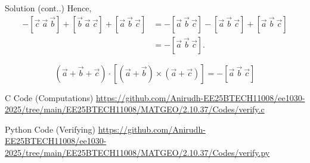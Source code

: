 \documentclass{beamer}
\begin{document}
\begin{frame}{Solution (cont..)}
Hence,
\begin{align}
- [\vec{c}\ \vec{a}\ \vec{b}] + [\vec{b}\ \vec{a}\ \vec{c}] + [\vec{a}\ \vec{b}\ \vec{c}]
&= -[\vec{a}\ \vec{b}\ \vec{c}] - [\vec{a}\ \vec{b}\ \vec{c}] + [\vec{a}\ \vec{b}\ \vec{c}] \\[4pt]
&= -[\vec{a}\ \vec{b}\ \vec{c}].
\end{align}

\[
\boxed{(\vec{a} + \vec{b} + \vec{c}) \cdot [(\vec{a} + \vec{b}) \times (\vec{a} + \vec{c})] = -[\vec{a}\ \vec{b}\ \vec{c}]}
\]
\end{frame}

\begin{frame}[fragile]{C Code (Computations)}
\url{https://github.com/Anirudh-EE25BTECH11008/ee1030-2025/tree/main/EE25BTECH11008/MATGEO/2.10.37/Codes/verify.c}
\end{frame}

\begin{frame}[fragile]{Python Code (Verifying)}
\url{https://github.com/Anirudh-EE25BTECH11008/ee1030-2025/tree/main/EE25BTECH11008/MATGEO/2.10.37/Codes/verify.py}
\end{frame}
\end{document}
